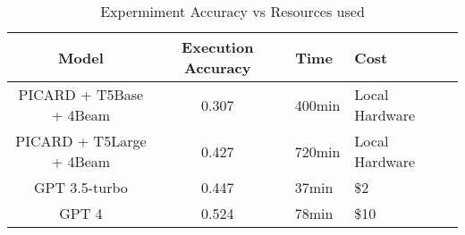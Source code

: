 \begin{table}[!ht]
    \centering
    \begin{tabular}{|c|c|c|L|L|}
        \hline
        Model                    & \textbf{Execution Accuracy} & \textbf{Time} & \textbf{Cost}  \\ \hline
        PICARD + T5Base + 4Beam  & 0.307                       & ~400min       & Local Hardware \\ \hline
        PICARD + T5Large + 4Beam & 0.427                       & ~720min       & Local Hardware \\ \hline
        GPT 3.5-turbo            & 0.447                       & 37min         & \$2            \\ \hline
        GPT 4                    & 0.524                       & 78min         & \$10           \\ \hline
    \end{tabular}
    \caption{Expermiment Accuracy vs Resources used}
\end{table}
